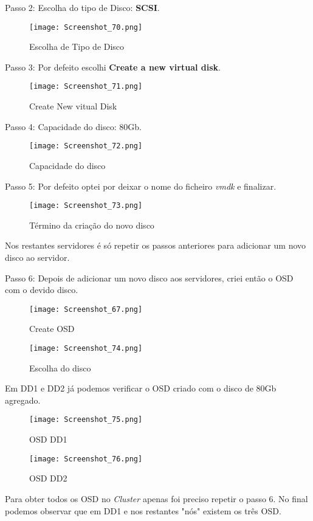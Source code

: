 \newpage
Passo 2: Escolha do tipo de Disco: \textbf{\ac{SCSI}}.
\begin{figure}[H]
\center
\texttt{[image: Screenshot\_70.png]}
\caption{Escolha de Tipo de Disco}
\end{figure}

Passo 3: Por defeito escolhi \textbf{Create a new virtual disk}.
\begin{figure}[H]
\center
\texttt{[image: Screenshot\_71.png]}
\caption{Create New vitual Disk}
\end{figure}

\newpage
Passo 4: Capacidade do disco: 80Gb.
\begin{figure}[H]
\center
\texttt{[image: Screenshot\_72.png]}
\caption{Capacidade do disco}
\end{figure}

Passo 5: Por defeito optei por deixar o nome do ficheiro \textit{vmdk} e finalizar.
\begin{figure}[H]
\center
\texttt{[image: Screenshot\_73.png]}
\caption{Término da criação do novo disco}
\end{figure}

Nos restantes servidores é só repetir os passos anteriores para adicionar um novo disco ao servidor.

\newpage
Passo 6: Depois de adicionar um novo disco aos servidores, criei então o \ac{OSD} com o devido disco.
\begin{figure}[H]
\center
\texttt{[image: Screenshot\_67.png]}
\caption{Create OSD}
\end{figure}

\begin{figure}[H]
\center
\texttt{[image: Screenshot\_74.png]}
\caption{Escolha do disco}
\end{figure}

\newpage
Em DD1 e DD2 já podemos verificar o \ac{OSD} criado com o disco de 80Gb agregado.
\begin{figure}[H]
\center
\texttt{[image: Screenshot\_75.png]}
\caption{OSD DD1}
\end{figure}

\begin{figure}[H]
\center
\texttt{[image: Screenshot\_76.png]}
\caption{OSD DD2}
\end{figure}

\newpage
Para obter todos os \ac{OSD} no \textit{Cluster} apenas foi preciso repetir o passo 6.
No final podemos observar que em DD1 e nos restantes "nós" existem os três \ac{OSD}.

